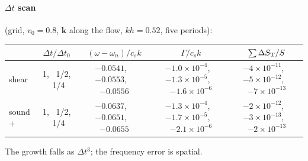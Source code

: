 \documentclass[11pt,aps,preprint,nofootinbib,superscriptaddress,tightenlines]{revtex4-2}
\let\oldparagraph\paragraph
\renewcommand{\paragraph}{\par\bigskip\oldparagraph}
\begin{document}
\paragraph{$\Delta t$ scan} (grid, $v_0=0.8$, $\bm k$ along the flow, $kh=0.52$, five periods):
\begin{center}
\begin{tabular}{lcccc}
\hline
 & $\Delta t/\Delta t_0$ & $(\omega-\omega_n)/c_sk$ & $\Gamma/c_sk$ & $\sum\Delta S_{\rm T}/S$ \\ \hline
shear & 1, \ 1/2, \ 1/4 & $-0.0541$, \ $-0.0553$, \ $-0.0556$ & $-1.0\times10^{-4}$, \ $-1.3\times10^{-5}$, \ $-1.6\times10^{-6}$ & $-4\times10^{-11}$, \ $-5\times10^{-12}$, \ $-7\times10^{-13}$\\
sound $+$ & 1, \ 1/2, \ 1/4 & $-0.0637$, \ $-0.0651$, \ $-0.0655$ & $-1.3\times10^{-4}$, \ $-1.7\times10^{-5}$, \ $-2.1\times10^{-6}$ & $-2\times10^{-12}$, \ $-3\times10^{-13}$, \ $-2\times10^{-13}$\\
\hline
\end{tabular}
\end{center}
The growth falls as $\Delta t^3$; the frequency error is spatial.
\end{document}
